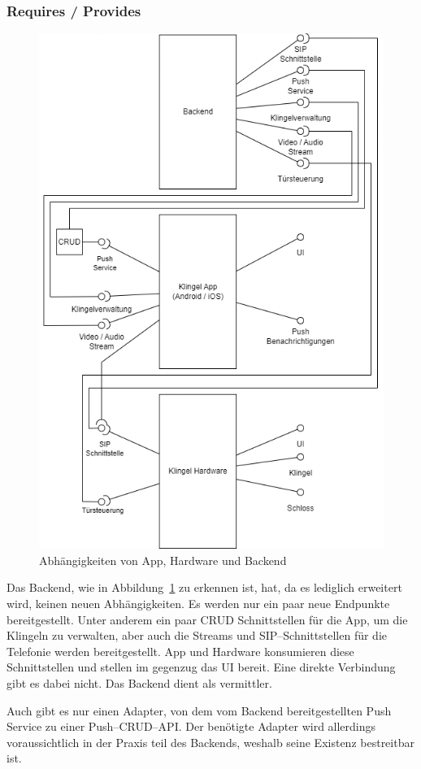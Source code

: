 \subsubsection{Requires / Provides}\label{subsubsec:requires-/-provides}
    \begin{figure}[ht!]
        \centering\includegraphics[width=\paperwidth/2]{../assets/img/requires_provides}

        \caption{Abhängigkeiten von App, Hardware und Backend}
        \label{fig:requires-provides}
    \end{figure}
    Das Backend, wie in Abbildung~\ref{fig:requires-provides} zu erkennen ist, hat, da es lediglich erweitert wird, keinen neuen Abhängigkeiten.
    Es werden nur ein paar neue Endpunkte bereitgestellt.
    Unter anderem ein paar CRUD Schnittstellen für die App, um die Klingeln zu verwalten, aber auch die Streams und SIP--Schnittstellen für die Telefonie werden bereitgestellt.
    App und Hardware konsumieren diese Schnittstellen und stellen im gegenzug das UI bereit.
    Eine direkte Verbindung gibt es dabei nicht.
    Das Backend dient als vermittler.


    Auch gibt es nur einen Adapter, von dem vom Backend bereitgestellten Push Service zu einer Push--CRUD--API\@.
    Der benötigte Adapter wird allerdings voraussichtlich in der Praxis teil des Backends, weshalb seine Existenz bestreitbar ist.
